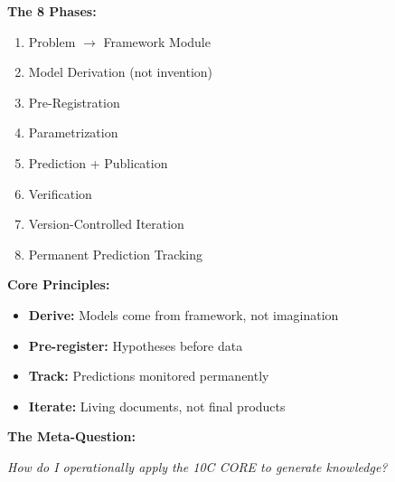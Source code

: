 
\begin{tcolorbox}[colback=blue!5!white, colframe=blue!75!black,
    title=\textbf{Quick Reference: The EBF Application Process}]

\textbf{The 8 Phases:}
\begin{enumerate}[nosep]
    \item Problem $\to$ Framework Module
    \item Model Derivation (not invention)
    \item Pre-Registration
    \item Parametrization
    \item Prediction + Publication
    \item Verification
    \item Version-Controlled Iteration
    \item Permanent Prediction Tracking
\end{enumerate}

\textbf{Core Principles:}
\begin{itemize}[nosep]
    \item \textbf{Derive:} Models come from framework, not imagination
    \item \textbf{Pre-register:} Hypotheses before data
    \item \textbf{Track:} Predictions monitored permanently
    \item \textbf{Iterate:} Living documents, not final products
\end{itemize}

\textbf{The Meta-Question:}
\begin{center}
\textit{How do I operationally apply the 10C CORE to generate knowledge?}
\end{center}

\end{tcolorbox}




